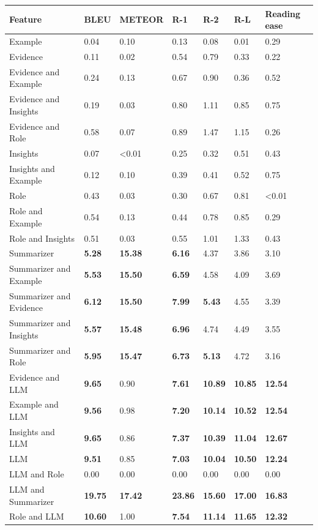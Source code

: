 \begin{tabular}{|l|l|l|l|l|l|l|}
\hline
\textbf{Feature} & BLEU & METEOR & R-1 & R-2 & R-L & Reading ease \\
 \hline
 Example & 0.04 & 0.10 & 0.13 & 0.08 & 0.01 & 0.29 \\
 \hline
 Evidence & 0.11 & 0.02 & 0.54 & 0.79 & 0.33 & 0.22 \\
 \hline
 Evidence and Example & 0.24 & 0.13 & 0.67 & 0.90 & 0.36 & 0.52 \\
 \hline
 Evidence and Insights & 0.19 & 0.03 & 0.80 & 1.11 & 0.85 & 0.75 \\
 \hline
 Evidence and Role & 0.58 & 0.07 & 0.89 & 1.47 & 1.15 & 0.26 \\
 \hline
 Insights & 0.07 & \textless{}0.01 & 0.25 & 0.32 & 0.51 & 0.43 \\
 \hline
 Insights and Example & 0.12 & 0.10 & 0.39 & 0.41 & 0.52 & 0.75 \\
 \hline
 Role & 0.43 & 0.03 & 0.30 & 0.67 & 0.81 & \textless{}0.01 \\
 \hline
 Role and Example & 0.54 & 0.13 & 0.44 & 0.78 & 0.85 & 0.29 \\
 \hline
 Role and Insights & 0.51 & 0.03 & 0.55 & 1.01 & 1.33 & 0.43 \\
 \hline
 Summarizer & \textbf{5.28} & \textbf{15.38} & \textbf{6.16} & 4.37 & 3.86 & 3.10 \\
 \hline
 Summarizer and Example & \textbf{5.53} & \textbf{15.50} & \textbf{6.59} & 4.58 & 4.09 & 3.69 \\
 \hline
 Summarizer and Evidence & \textbf{6.12} & \textbf{15.50} & \textbf{7.99} & \textbf{5.43} & 4.55 & 3.39 \\
 \hline
 Summarizer and Insights & \textbf{5.57} & \textbf{15.48} & \textbf{6.96} & 4.74 & 4.49 & 3.55 \\
 \hline
 Summarizer and Role & \textbf{5.95} & \textbf{15.47} & \textbf{6.73} & \textbf{5.13} & 4.72 & 3.16 \\
 \hline
 Evidence and LLM & \textbf{9.65} & 0.90 & \textbf{7.61} & \textbf{10.89} & \textbf{10.85} & \textbf{12.54} \\
 \hline
 Example and LLM & \textbf{9.56} & 0.98 & \textbf{7.20} & \textbf{10.14} & \textbf{10.52} & \textbf{12.54} \\
 \hline
 Insights and LLM & \textbf{9.65} & 0.86 & \textbf{7.37} & \textbf{10.39} & \textbf{11.04} & \textbf{12.67} \\
 \hline
 LLM & \textbf{9.51} & 0.85 & \textbf{7.03} & \textbf{10.04} & \textbf{10.50} & \textbf{12.24} \\
 \hline
 LLM and Role & 0.00 & 0.00 & 0.00 & 0.00 & 0.00 & 0.00 \\
 \hline
 LLM and Summarizer & \textbf{19.75} & \textbf{17.42} & \textbf{23.86} & \textbf{15.60} & \textbf{17.00} & \textbf{16.83} \\
 \hline
 Role and LLM & \textbf{10.60} & 1.00 & \textbf{7.54} & \textbf{11.14} & \textbf{11.65} & \textbf{12.32} \\
\hline
\end{tabular}
